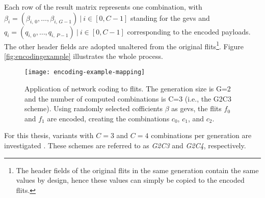 Each row of the result matrix represents one combination, with $\beta_i = (\beta_{i,\,0}, …, \beta_{i,\,G-1})\ |\ i \in [0, C-1]$ standing
for the \glspl{gev} and $q_i = (q_{i,\,0}, …, q_{i,\,P-1})\ |\ i \in [0, C-1]$ corresponding to the encoded payloads. The other header fields
are adopted unaltered from the original flits\footnote{The header fields of the original flits in the same generation contain the same values by
design, hence these values can simply be copied to the encoded flits.}. Figure \vref{fig:encodingexample} illustrates the whole process.

\begin{figure}
    \centering
    \texttt{[image: encoding-example-mapping]}
    \caption[Application of network coding to flits]{Application of network coding to flits. The generation size is G=2 and the number of computed
    combinations is C=3 (i.e., the G2C3 scheme). Using randomly selected cofficients $\beta$ as \glspl{gev}, the flits $f_0$ and $f_1$ are encoded,
    creating the combinations $c_0$, $c_1$, and $c_2$.}
    \label{fig:encodingexample}
\end{figure}

For this thesis, variants with $C = 3$ and $C = 4$ combinations per generation are investigated \cite[cf.][2]{moriam18activeattackers}. These schemes
are referred to as \textit{G2C3} and \textit{G2C4}, respectively.

